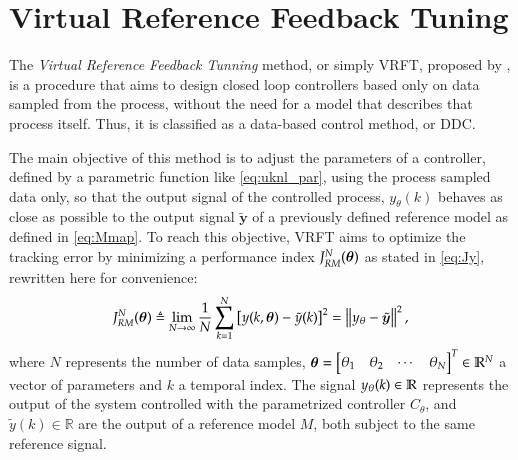 

\chapter{Virtual Reference Feedback Tuning}\label{cap:VRFT}
\vspace{-1cm}


The \textit{Virtual Reference Feedback Tunning} method, or simply VRFT, proposed by \cite{campi2002}, is a procedure that aims to design closed loop controllers based only on data sampled from the process, without the need for a model that describes that process itself. Thus, it is classified as a data-based control method, or DDC.

The main objective of this method is to adjust the parameters of a controller, defined by a parametric function like \eqref{eq:uknl_par}, using the process sampled data only, so that the output signal of the controlled process, $y_\theta(k)$ behaves as close as possible to the output signal $\tilde{\bm{y}}$ of a previously defined reference model as defined in \eqref{eq:Mmap}.
To reach this objective, VRFT aims to optimize the tracking error by minimizing a performance index $J_{RM}^N(\bm{\theta})$ as stated in \eqref{eq:Jy}, rewritten here for convenience:
\begin{equation}
   J_{RM}^N(\bm{\theta}) \triangleq \lim_{N \to \infty}  \frac{1}{N} \sum_{k=1}^N \left[y(k,\bm{\theta}) - \tilde{y}(k)\right]^2 = 
    \left\lVert y_\theta - \tilde{\bm{y}} \right\lVert^{2}
   \label{eq:Jy},
\end{equation}
where $N$ represents the number of data samples, $\bm{\theta} = \begin{bmatrix} \theta_1 & \theta_2 & \cdots & \theta_N \end{bmatrix}^T \in \mathbb{R}^N$ a vector of parameters and $k$ a temporal index. The signal $y_\theta(k) \in \mathbb{R} $ represents the output of the  system controlled with the parametrized controller $C_\theta$, and $\tilde{y}(k) \in \mathbb{R}$ are the output of a reference model $M$, both subject to the same reference signal.

